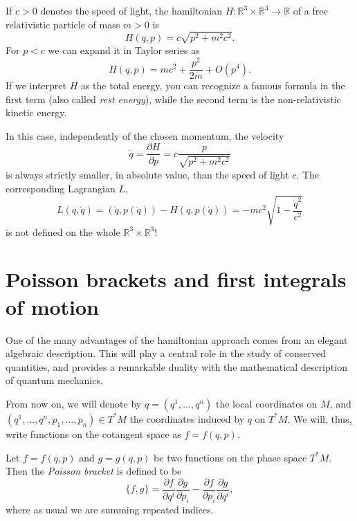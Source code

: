 \documentclass[english,fontsize=11pt,paper=a5,oneside]{scrbook}
\newcommand{\R}{\mathbb{R}}
\theoremstyle{definition}
\newenvironment{example}
  {\pushQED{\qed}\renewcommand{\qedsymbol}{$\lozenge$}\examplex}
  {\popQED\endexamplex}
\begin{document}
\begin{example}[The relativistic hamiltonian]
  If $c>0$ denotes the speed of light, the hamiltonian $H:\R^3\times\R^3\to\R$ of a free relativistic particle of mass $m>0$ is
  \begin{equation}
    H(q,p) = c \sqrt{p^2 + m^2 c^2}.
  \end{equation}
  For $p < c$ we can expand it in Taylor series as
  \begin{equation}
    H(q,p) = mc^2 + \frac{p^2}{2m} + O(p^4).
  \end{equation}
  If we interpret $H$ as the total energy, you can recognize a famous formula in the first term (also called \emph{rest energy}), while the second term is the non-relativistic kinetic energy.

  In this case, independently of the chosen momentum, the velocity
  \begin{equation}
    \dot q = \frac{\partial H}{\partial p} = c \frac{p}{\sqrt{p^2 + m^2 c^2}}
  \end{equation}
  is always strictly smaller, in absolute value, than the speed of light $c$.
  The corresponding Lagrangian $L$,
  \begin{equation}
    L(q,\dot q) = (\dot q, p(\dot q)) - H(q, p(\dot q)) = -mc^2 \sqrt{1-\frac{\dot q^2}{c^2}}
  \end{equation}
  is not defined on the whole $\R^3\times\R^3$!
\end{example}

\section{Poisson brackets and first integrals of motion}\label{sec:poisson}

One of the many advantages of the hamiltonian approach comes from an elegant algebraic description.
This will play a central role in the study of conserved quantities, and provides a remarkable duality with the mathematical description of quantum mechanics.

From now on, we will denote by $q = (q^1, \ldots, q^n)$ the local coordinates on $M$, and $(q^1, \ldots, q^n, p_1, \ldots, p_n)\in T^*M$ the coordinates induced by $q$ on $T^*M$. We will, thus, write functions on the cotangent space as $f=f(q,p)$.

\begin{tcolorbox}
  Let $f=f(q,p)$ and $g=g(q,p)$ be two functions on the phase space $T^*M$.
  Then the \emph{Poisson bracket} is defined to be
  \begin{equation}\label{def:Poisson}
    \big\{f,g\big\} = \frac{\partial f}{\partial q^i}\frac{\partial g}{\partial p_i} - \frac{\partial f}{\partial p_i}\frac{\partial g}{\partial q^i},
  \end{equation}
  where as usual we are summing repeated indices.
\end{tcolorbox}
\end{document}
